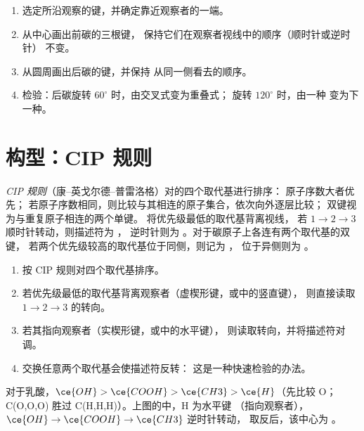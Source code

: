 \begin{method}[由楔形式到纽曼投影式]\label{met:b1:stereochemistry-in-depth:newman-from-cram}
\begin{enumerate}
  \item 选定所沿观察的键，并确定靠近观察者的一端。
  \item 从中心画出前碳的三根键，
        保持它们在观察者视线中的顺序（顺时针或逆时针）
        不变。
  \item 从圆周画出后碳的键，并保持
        从同一侧看去的顺序。
  \item 检验：后碳旋转 $60^\circ$ 时，由交叉式变为重叠式；
        旋转 $120^\circ$ 时，由一种
        变为下一种。
\end{enumerate}
\end{method}

\section{构型：CIP 规则}

\begin{definition}\label{def:b1:stereochemistry-in-depth:cip}
\emph{CIP 规则}（康–英戈尔德–普雷洛格）对的四个取代基进行排序：
原子序数大者优先；
若原子序数相同，则比较与其相连的原子集合，依次向外逐层比较；
双键视为与重复原子相连的两个单键。
将优先级最低的取代基背离视线，
若 $1 \to 2 \to 3$ 顺时针转动，则描述符为 ，
逆时针则为 。对于碳原子上各连有两个取代基的双键，
若两个优先级较高的取代基位于同侧，则记为 ，
位于异侧则为 。
\end{definition}

\begin{method}\label{met:b1:stereochemistry-in-depth:cip}
\begin{enumerate}
  \item 按 CIP 规则对四个取代基排序。
  \item 若优先级最低的取代基背离观察者（虚楔形键，或中的竖直键），
        则直接读取
        $1 \to 2 \to 3$ 的转向。
  \item 若其指向观察者（实楔形键，或中的水平键），
        则读取转向，并将描述符对调。
  \item 交换任意两个取代基会使描述符反转：
        这是一种快速检验的办法。
\end{enumerate}
对于乳酸，$\ce{OH} > \ce{COOH} > \ce{CH3} > \ce{H}$（先比较 O；
C(O,O,O) 胜过 C(H,H,H)）。上图的中，H 为水平键
（指向观察者），$\ce{OH} \to \ce{COOH} \to \ce{CH3}$ 逆时针转动，
取反后，该中心为 。
\end{method}

